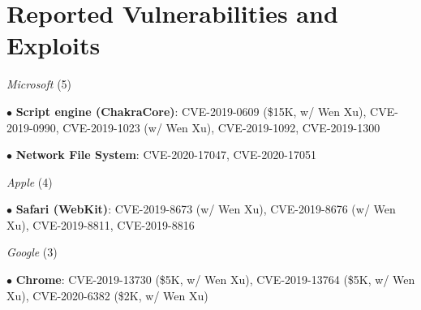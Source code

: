 \section*{Reported Vulnerabilities and Exploits}
\begin{description}

\item {\emph{Microsoft} (5)}
	\item $\bullet$ \textbf{Script engine (ChakraCore)}: CVE-2019-0609 (\$15K, w/ Wen Xu), CVE-2019-0990, CVE-2019-1023 (w/ Wen Xu), CVE-2019-1092, CVE-2019-1300
  \item $\bullet$ \textbf{Network File System}: CVE-2020-17047, CVE-2020-17051

\item {\emph{Apple} (4)}
\item $\bullet$ \textbf{Safari (WebKit)}: CVE-2019-8673 (w/ Wen Xu), CVE-2019-8676 (w/ Wen Xu), CVE-2019-8811, CVE-2019-8816

\item {\emph{Google} (3)}
\item $\bullet$ \textbf{Chrome}: CVE-2019-13730 (\$5K, w/ Wen Xu), CVE-2019-13764 (\$5K, w/ Wen Xu), CVE-2020-6382 (\$2K, w/ Wen Xu)

\end{description}
